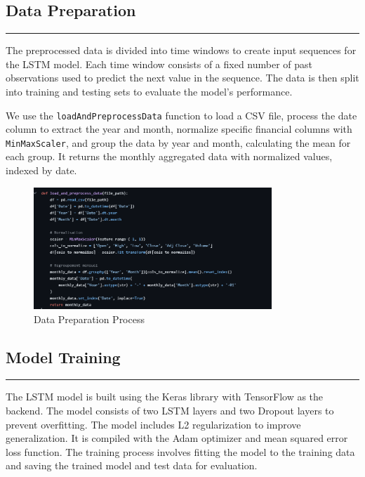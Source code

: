 \documentclass{article}
\begin{document}
\subsection{Data Preparation}
\noindent\rule{\textwidth}{1pt} %
The preprocessed data is divided into time windows to create input sequences for the LSTM model. Each time window consists of a fixed number of past observations used to predict the next value in the sequence. The data is then split into training and testing sets to evaluate the model's performance.

We use the \texttt{loadAndPreprocessData} function to load a CSV file, process the date column to extract the year and month, normalize specific financial columns with \texttt{MinMaxScaler}, and group the data by year and month, calculating the mean for each group. It returns the monthly aggregated data with normalized values, indexed by date.

\begin{figure}[h]
    \centering
    \includegraphics[width=0.8\textwidth]{img/capturenb2.png}
    \caption{Data Preparation Process} %
    \label{fig:data-preparation}
\end{figure}

\subsection{Model Training}
\noindent\rule{\textwidth}{1pt} %
The LSTM model is built using the Keras library with TensorFlow as the backend. The model consists of two LSTM layers and two Dropout layers to prevent overfitting. The model includes L2 regularization to improve generalization. It is compiled with the Adam optimizer and mean squared error loss function. The training process involves fitting the model to the training data and saving the trained model and test data for evaluation.
\end{document}
